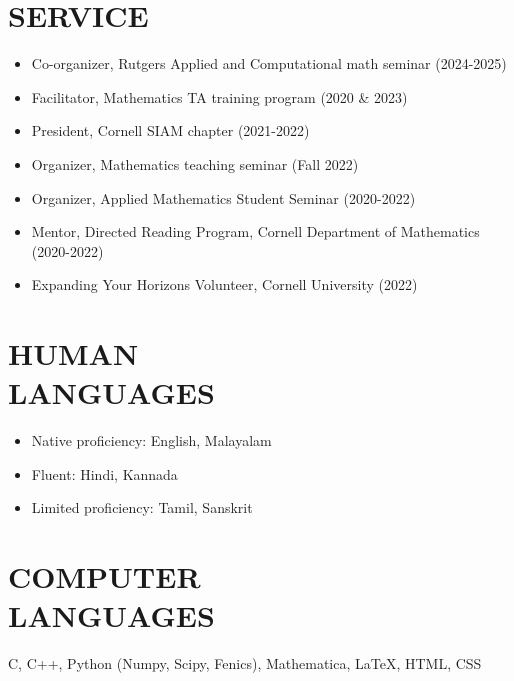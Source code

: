 \documentclass[margin]{res} %
\begin{document}
\begin{resume}
\section{SERVICE}
\begin{itemize}
	\item Co-organizer, Rutgers Applied and Computational math seminar (2024-2025)
	\item Facilitator, Mathematics TA training program (2020 \& 2023)
	\item President, Cornell SIAM chapter (2021-2022)
	\item Organizer, Mathematics teaching seminar (Fall 2022)
	\item Organizer, Applied Mathematics Student Seminar (2020-2022)
	\item Mentor, Directed Reading Program, Cornell Department of Mathematics (2020-2022)
	\item Expanding Your Horizons Volunteer, Cornell University (2022)
\end{itemize}

\section{HUMAN \\ LANGUAGES}
\begin{itemize}
	\item Native proficiency: English, Malayalam
	\item Fluent: Hindi, Kannada
	\item Limited proficiency: Tamil, Sanskrit
\end{itemize}

\section{COMPUTER \\ LANGUAGES}
C, C++, Python (Numpy, Scipy, Fenics), Mathematica, \LaTeX, HTML, CSS

\end{resume}
\end{document}
